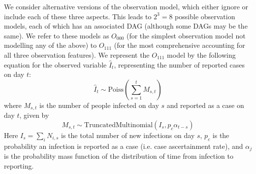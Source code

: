 \documentclass{article}
\begin{document}
\begin{enumerate}
We consider alternative versions of the observation model, which either ignore or include each of these three aspects. This leads to $2^3=8$ possible observation models, each of which has an associated DAG (although some DAGs may be the same).
We refer to these models as $O_{000}$ (for the simplest observation model not modelling any of the above) to $O_{111}$ (for the most comprehensive accounting for all three observation features). We represent the $O_{111}$ model by the following equation for the observed variable $\hat{I}_t$, representing the number of reported cases on day $t$:
\begin{equation} \label{eq:cases}
    \hat{I}_t \sim \mathrm{Poiss}\left( \sum_{s=1}^t M_{s,t}\right)
\end{equation}
where $M_{s,t}$ is the number of people infected on day $s$ and reported as a case on day $t$, given by
\begin{equation}
    M_{s,t} \sim \mathrm{TruncatedMultinomial}\left( I_s, p_c\alpha_{t-s}\right) 
\end{equation}
Here $I_s=\sum_i N_{i,s}$ is the total number of new infections on day $s$, $p_c$ is the probability an infection is reported as a case (i.e. case ascertainment rate), and $\alpha_j$ is the probability mass function of the distribution of time from infection to reporting.




\end{enumerate}
\end{document}
